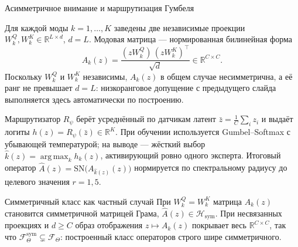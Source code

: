 \documentclass[10pt]{beamer}
\DeclareMathOperator*{\argmax}{arg\,max}
\newcommand{\R}{\mathbb{R}}
\newcommand{\Hsym}{\mathcal{H}_{\mathrm{sym}}}
\begin{document}
\begin{frame}{Асимметричное внимание и маршрутизация Гумбеля}
\footnotesize

Для каждой моды $k=1,\dots,K$ заведены две независимые проекции $W^Q_k,
W^K_k \in \R^{L\times d}$, $d=L$. Модовая матрица --- нормированная
билинейная форма
\[
A_k(z) = \frac{(zW^Q_k)\,(zW^K_k)^\top}{\sqrt d} \in \R^{C\times C}.
\]
Поскольку $W^Q_k$ и $W^K_k$ независимы, $A_k(z)$ в общем случае
несимметрична, а её ранг не превышает $d=L$: низкоранговое допущение с
предыдущего слайда выполняется здесь автоматически по построению.

Маршрутизатор $R_\psi$ берёт усреднённый по датчикам латент $\bar z =
\frac1C\sum_i z_i$ и выдаёт логиты $h(z)=R_\psi(\bar z)\in\R^K$. При обучении
используется Gumbel--Softmax с убывающей температурой; на выводе --- жёсткий
выбор $\hat k(z)=\argmax_k h_k(z)$, активирующий ровно одного эксперта.
Итоговый оператор $\hat A(z) = \mathrm{SN}\bigl(A_{\hat k(z)}(z)\bigr)$
нормируется по спектральному радиусу до целевого значения $r=1{,}5$.

\begin{block}{Симметричный класс как частный случай}
При $W^Q_k=W^K_k$ матрица $A_k(z)$ становится симметричной матрицей Грама,
$\hat A(z)\in\Hsym$. При несвязанных проекциях и $d\ge C$ образ отображения
$z\mapsto A_k(z)$ покрывает весь $\R^{C\times C}$, так что
$\mathcal F_\Theta^{\mathrm{sym}} \subsetneq \mathcal F_\Theta$: построенный
класс операторов строго шире симметричного.
\end{block}
\end{frame}
\end{document}
